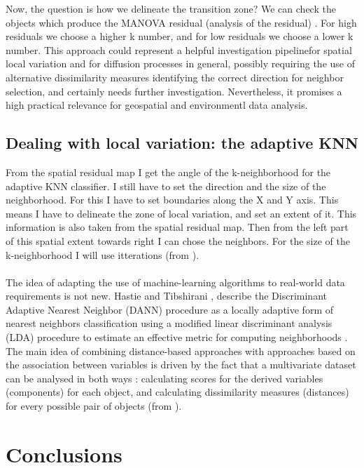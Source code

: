 \documentclass {article}
\begin{document}
Now, the question is how we delineate the transition zone? We can check the objects which produce the MANOVA residual (analysis of the residual) \cite{quinn_experimental_2002}.        
For high residuals we choose a higher k number, and for low residuals we choose a lower k number. This approach could represent a helpful investigation pipelinefor spatial local variation and for diffusion processes in general, possibly requiring the use of alternative dissimilarity measures identifying the correct direction for neighbor selection, and certainly needs further investigation. 
 Nevertheless, it promises a high practical relevance for geospatial and environmentl data analysis.
 
\subsection {Dealing with local variation: the adaptive KNN}

From the spatial residual map I get the angle of the k-neighborhood for the adaptive KNN classifier. I still have to set the direction and the size of the neighborhood. For this I have to set boundaries along the X and Y axis. This means I have to delineate the zone of local variation, and set an extent of it. This information is also taken from the spatial residual map. Then from the left part of this spatial extent towards right I can chose the neighbors. For the size of the k-neighborhood I will use itterations (from \cite{tesileanu_geostatistics_2017}).        
\\
\\
The idea of adapting the use of machine-learning algorithms to real-world data requirements is not new. 
Hastie and Tibshirani \cite{hastie_discriminant_1996}, describe the Discriminant Adaptive Nearest Neighbor (DANN) procedure as a locally adaptive form of nearest neighbors classification using a modified linear discriminant analysis (LDA) procedure to estimate an effective metric for computing neighborhoods \cite{tesileanu_introduction_2017}.
The main idea of combining distance-based approaches with approaches based on the association between variables is driven by the fact that a multivariate dataset can be analysed in both ways \cite{quinn_experimental_2002}: calculating scores for the derived variables (components) for each object, and calculating dissimilarity measures (distances) for every possible pair of objects (from \cite{tesileanu_introduction_2017}).

\section {Conclusions} 
\end{document}
